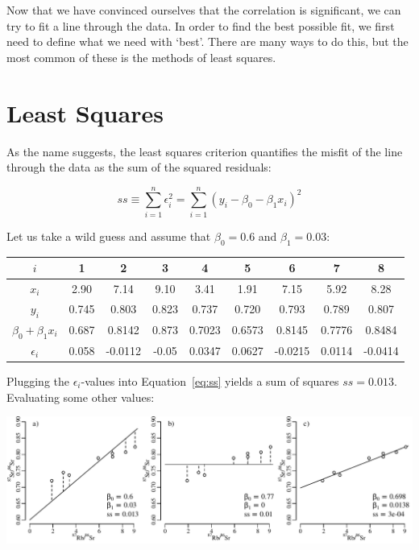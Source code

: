 Now that we have convinced ourselves that the correlation is
significant, we can try to fit a line through the data. In order to
find the best possible fit, we first need to define what we need with
`best'. There are many ways to do this, but the most common of these
is the methods of least squares.

\section{Least Squares}
\label{sec:leastsquares}

As the name suggests, the least squares criterion quantifies the
misfit of the line through the data as the sum of the squared
residuals:

\begin{equation}
ss \equiv \sum_{i=1}^{n} \epsilon_i^2 = \sum_{i=1}^{n} (y_i - \beta_0 - \beta_1 x_i)^2
\label{eq:ss}
\end{equation}

Let us take a wild guess and assume that $\beta_0=0.6$ and
$\beta_1=0.03$:

\begin{center}
  \begin{tabular}{c|cccccccc}
    $i$ & 1 & 2 & 3 & 4 & 5 & 6 & 7 & 8 \\ \hline
    $x_i$ & 2.90 & 7.14 & 9.10 & 3.41 & 1.91 & 7.15 & 5.92 & 8.28 \\
    $y_i$ & 0.745 & 0.803 & 0.823 & 0.737 & 0.720 & 0.793 & 0.789 & 0.807 \\ \hline
    $\beta_0 + \beta_1 x_i$ & 0.687 & 0.8142 & 0.873 & 0.7023 &
    0.6573 & 0.8145 & 0.7776 & 0.8484 \\
    $\epsilon_i$ & 0.058 & -0.0112 & -0.05 & 0.0347 & 0.0627 &
    -0.0215 & 0.0114 & -0.0414
  \end{tabular}
\end{center}

Plugging the $\epsilon_i$-values into Equation~\ref{eq:ss} yields a
sum of squares $ss=0.013$. Evaluating some other values:

\noindent\includegraphics[width=\textwidth]{../figures/tryRbSr.pdf}
\begingroup {} \endgroup

